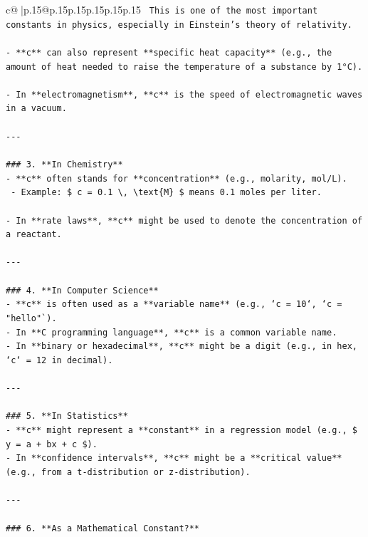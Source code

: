 \documentclass{article}
\begin{document}
{\begin{supertabular}{c@{$\;$}|p{.15\linewidth}@{}p{.15\linewidth}p{.15\linewidth}p{.15\linewidth}p{.15\linewidth}p{.15\linewidth}}
{{{\texttt{  This is one of the most important constants in physics, especially in Einstein's theory of relativity.} \\
\\ 
\texttt{{-} **c** can also represent **specific heat capacity** (e.g., the amount of heat needed to raise the temperature of a substance by 1°C).} \\
\\ 
\texttt{{-} In **electromagnetism**, **c** is the speed of electromagnetic waves in a vacuum.} \\
\\ 
\texttt{{-}{-}{-}} \\
\\ 
\texttt{\#\#\# 3. **In Chemistry**} \\
\texttt{{-} **c** often stands for **concentration** (e.g., molarity, mol/L).} \\
\texttt{  {-} Example: \$ c = 0.1 \textbackslash{}, \textbackslash{}text\{M\} \$ means 0.1 moles per liter.} \\
\\ 
\texttt{{-} In **rate laws**, **c** might be used to denote the concentration of a reactant.} \\
\\ 
\texttt{{-}{-}{-}} \\
\\ 
\texttt{\#\#\# 4. **In Computer Science**} \\
\texttt{{-} **c** is often used as a **variable name** (e.g., `c = 10`, `c = "hello"`).} \\
\texttt{{-} In **C programming language**, **c** is a common variable name.} \\
\texttt{{-} In **binary or hexadecimal**, **c** might be a digit (e.g., in hex, `c` = 12 in decimal).} \\
\\ 
\texttt{{-}{-}{-}} \\
\\ 
\texttt{\#\#\# 5. **In Statistics**} \\
\texttt{{-} **c** might represent a **constant** in a regression model (e.g., \$ y = a + bx + c \$).} \\
\texttt{{-} In **confidence intervals**, **c** might be a **critical value** (e.g., from a t{-}distribution or z{-}distribution).} \\
\\ 
\texttt{{-}{-}{-}} \\
\\ 
\texttt{\#\#\# 6. **As a Mathematical Constant?**} \\
}}}
\end{supertabular}}
\end{document}
